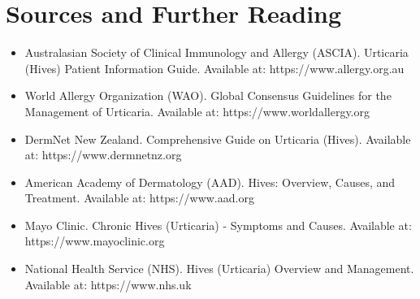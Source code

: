 \section*{Sources and Further Reading}
\begin{itemize}
    \item Australasian Society of Clinical Immunology and Allergy (ASCIA). Urticaria (Hives) Patient Information Guide. Available at: https://www.allergy.org.au
    \item World Allergy Organization (WAO). Global Consensus Guidelines for the Management of Urticaria. Available at: https://www.worldallergy.org
    \item DermNet New Zealand. Comprehensive Guide on Urticaria (Hives). Available at: https://www.dermnetnz.org
    \item American Academy of Dermatology (AAD). Hives: Overview, Causes, and Treatment. Available at: https://www.aad.org
    \item Mayo Clinic. Chronic Hives (Urticaria) - Symptoms and Causes. Available at: https://www.mayoclinic.org
    \item National Health Service (NHS). Hives (Urticaria) Overview and Management. Available at: https://www.nhs.uk
\end{itemize}